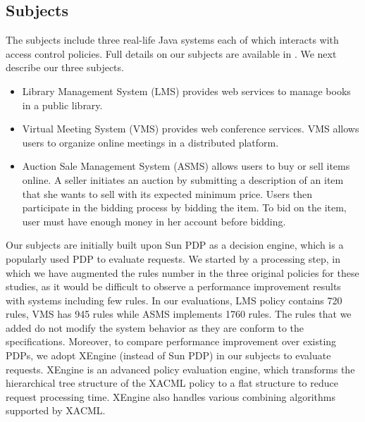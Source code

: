 \subsection{Subjects}
The subjects include three real-life Java systems each of which interacts with access control policies. 
Full details on our subjects are available in \cite{evaluation}. We next describe our three subjects.
\begin{itemize}	
\item Library Management System (LMS) provides web services to manage books in a public library.
\item Virtual Meeting System (VMS) provides web conference services. VMS allows users to organize
online meetings in a distributed platform.
\item Auction Sale Management System (ASMS) allows users to buy or sell items online. A seller 
initiates an auction by submitting a description of an item that she wants to sell with its expected minimum 
price. Users then participate in the bidding process by
bidding the item. To bid on the item, user must have enough money in her account before bidding.
\end{itemize}
Our subjects are initially built upon Sun PDP \cite{sunxacml} as a decision engine, which is a popularly used PDP to evaluate requests. We started by a processing step, in which we have augmented the rules number 
in the three original policies for these studies, as it would be difficult to observe a performance improvement results with systems including few rules. In our evaluations, LMS policy contains 720 rules, VMS has 
945 rules while ASMS implements 1760 rules. The rules that we added do not modify the system behavior as 
they are conform to the specifications. Moreover, to compare performance improvement over existing PDPs, we adopt XEngine (instead of Sun PDP) in our subjects to evaluate requests.
XEngine is an advanced policy evaluation engine, which transforms the hierarchical tree structure of the XACML policy to a flat structure to reduce request processing time. XEngine 
also handles various combining algorithms supported by XACML. 

